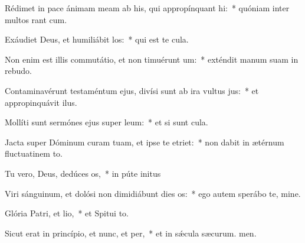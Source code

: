 \item Rédimet in pace ánimam meam ab his, qui appropínquant hi:~* quóniam inter multos rant cum.
\item Exáudiet Deus, et humiliábit los:~* qui est te cula.
\item Non enim est illis commutátio, et non timuérunt um:~* exténdit manum suam in rebudo.
\item Contaminavérunt testaméntum ejus, divísi sunt ab ira vultus jus:~* et appropinquávit  ilus.
\item Mollíti sunt sermónes ejus super leum:~* et si sunt cula.
\item Jacta super Dóminum curam tuam, et ipse te etriet:~* non dabit in ætérnum fluctuatinem to.
\item Tu vero, Deus, dedúces os,~* in púte initus
\item Viri sánguinum, et dolósi non dimidiábunt dies os:~* ego autem sperábo  te, mine.
\item Glória Patri, et lio,~* et Spitui to.
\item Sicut erat in princípio, et nunc, et per,~* et in sǽcula sæcurum. men.
